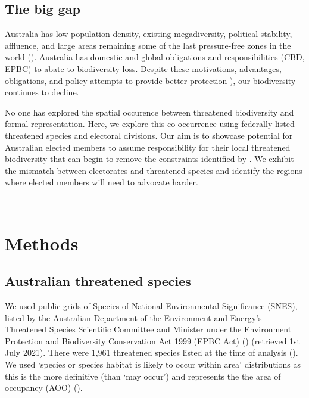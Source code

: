 \documentclass[a4paper,11pt]{article}
\begin{document}
\subsection{The big gap}

Australia has low population density, existing megadiversity, political stability, affluence, and large areas remaining some of the last pressure-free zones in the world (\cite{venterSixteenYearsChange2016}). Australia has domestic and global obligations and responsibilities (CBD, EPBC) to abate to biodiversity loss. Despite these motivations, advantages, obligations, and policy attempts to provide better protection \cite{wardLotsLossLittle2019}), our biodiversity continues to decline.

No one has explored the spatial occurence between threatened biodiversity and formal representation. Here, we explore this co-occurrence using federally listed threatened species and electoral divisions. Our aim is to showcase potential for Australian elected members to assume responsibility for their local threatened biodiversity that can begin to remove the constraints identified by \cite{leggeMonitoringThreatenedSpecies2018}. We exhibit the mismatch between electorates and threatened species and identify the regions where elected members will need to advocate harder.

\\ 

\section{Methods}

\subsection{Australian threatened species}

We used public grids of Species of National Environmental Significance (SNES), listed by the Australian Department of the Environment and Energy’s Threatened Species Scientific Committee and Minister under the Environment Protection and Biodiversity Conservation Act 1999 (EPBC Act) (\cite{commonwealthofaustraliaThreatenedSpeciesEPBC2021}) (retrieved 1st July 2021). There were 1,961 threatened species listed at the time of analysis (\cite{commonwealthofaustraliaThreatenedSpeciesEPBC2021}). We used ‘species or species habitat is likely to occur within area’ distributions as this is the more definitive (than ‘may occur’) and represents the the area of occupancy (AOO) (\cite{gastonSizesSpeciesGeographic2009}).
\end{document}
